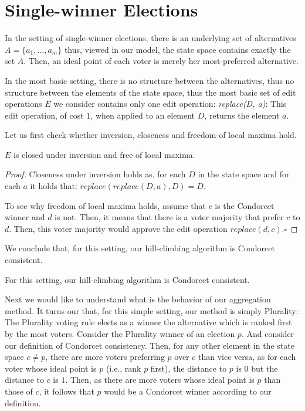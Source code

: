 \documentclass[sigconf]{aamas}  %
\newcommand{\qqed}{\hfill$\square$}
\begin{document}
\section{Single-winner Elections}

In the setting of single-winner elections, there is an underlying set of alternatives $A = \{a_1, \ldots, a_m\}$ thus, viewed in our model, the state space contains exactly the set $A$. Then, an ideal point of each voter is merely her most-preferred alternative.

In the most basic setting, there is no structure between the alternatives, thus no structure between the elements of the state space, thus the most basic set of edit operations $E$ we consider contains only one edit operation:
  \emph{replace(D, a)}:
    This edit operation, of cost $1$, when applied to an element $D$, returns the element $a$.

Let us first check whether inversion, closeness and freedom of local maxima hold.

\begin{lemma}
  $E$ is closed under inversion and free of local maxima.
\end{lemma}

\begin{proof}
%
Closeness under inversion holds as, for each $D$ in the state space and for each $a$ it holds that:
  $replace(replace(D, a), D) = D$.
  
To see why freedom of local maxima holds, assume that $c$ is the Condorcet winner and $d$ is not. Then, it means that there is a voter majority that prefer $c$ to $d$. Then, this voter majority would approve the edit operation $replace(d, c)$.\qqed
%
\end{proof}

We conclude that, for this setting, our hill-climbing algorithm is Condorcet consistent.

\begin{corollary}
  For this setting, our hill-climbing algorithm is Condorcet consistent.
\end{corollary}

Next we would like to understand what is the behavior of our aggregation method. It turns our that, for this simple setting, our method is simply Plurality:
  The Plurality voting rule elects as a winner the alternative which is ranked first by the most voters.
Consider the Plurality winner of an election $p$. And consider our definition of Condorcet consistency. Then, for any other element in the state space $c \neq p$, there are more voters preferring $p$ over $c$ than vice versa, as for each voter whose ideal point is $p$ (i.e., rank $p$ first), the distance to $p$ is $0$ but the distance to $c$ is $1$. Then, as there are more voters whose ideal point is $p$ than those of $c$, it follows that $p$ would be a Condorcet winner according to our definition.
\end{document}
